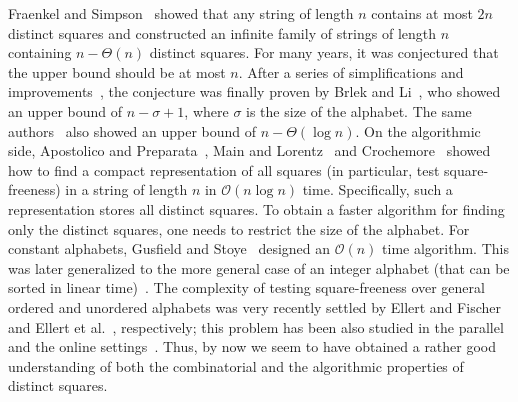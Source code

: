 \documentclass[11pt,letterpaper]{article}
\newcommand{\cO}{\mathcal{O}}
\begin{document}
Fraenkel and Simpson~\cite{DBLP:journals/jct/FraenkelS98} showed that any string of length $n$ contains
at most $2n$ distinct squares and constructed an infinite family of strings of length $n$ containing
$n-\Theta(n)$ distinct squares. For many years, it was conjectured that the upper bound should be at most $n$.
After a series of simplifications and improvements~\cite{Ilie05,Ilie07,Lam,DEZA,Thierry2020},
the conjecture was finally proven by Brlek and Li~\cite{Brlek}, who showed an upper bound of $n-\sigma+1$,
where $\sigma$ is the size of the alphabet.
The same authors~\cite{DBLP:conf/cwords/BrlekL23} also showed an upper bound of $n-\Theta(\log n)$.
On the algorithmic side, Apostolico and Preparata~\cite{ApostolicoP83},
Main and Lorentz~\cite{Main1984} and Crochemore~\cite{Crochemore1981}
showed how to find a compact representation of all squares (in particular, test square-freeness)
in a string of length $n$ in $\cO(n\log n)$ time. Specifically, such a representation stores
all distinct squares. To obtain a faster algorithm for finding only the distinct squares, one needs
to restrict the size of the alphabet.
For constant alphabets, Gusfield and Stoye~\cite{GusfieldS04} designed an $\cO(n)$ time algorithm.
This was later generalized to the more general case of an integer alphabet (that can be sorted in linear
time)~\cite{BannaiIK17,CrochemoreIKRRW14}. The complexity of testing square-freeness over general ordered and unordered alphabets was very recently settled by Ellert and Fischer~\cite{ellert_et_al:LIPIcs.ICALP.2021.63} and Ellert et al.~\cite{DBLP:conf/soda/EllertGG23}, respectively; this problem has been also studied in the
parallel~\cite{Apostolico92,Apostolico1996,CrochemoreR91,CrochemoreR91a} and
the online settings~\cite{LeungPT06,Hong2008,Kosolobov2014,Kosolobov2015a}.
Thus, by now we seem to have obtained a rather good understanding
of both the combinatorial and the algorithmic properties of distinct squares.
\end{document}
